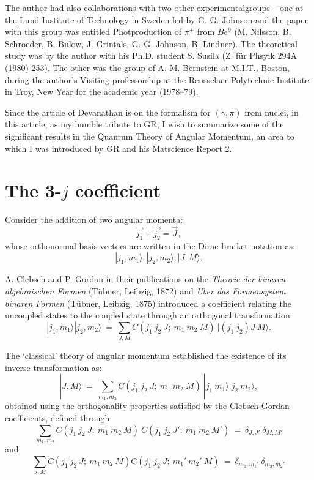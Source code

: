 The author had also collaborations with two other experimental\break groups -- one at the Lund Institute of Technology in Sweden led by G. G. Johnson and the paper with this group was  entitled Photproduction of $\pi^+$ from $Be^9$ (M. Nilsson, B. Schroeder, B. Bulow, J. Grintals, G. G. Johnson, B. Lindner). The theoretical study was by the author with his Ph.D. student S. Susila (Z. für Phsyik 294A (1980) 253). The other was the group of A. M. Bernstein at M.I.T., Boston, during the author's Visiting professorship at the Rensselaer Polytechnic Institute in Troy, New Year for the academic year (1978--79).

Since the article of Devanathan is on the formalism for $(\gamma,\pi)$ from nuclei, in this article, as my humble tribute to GR, I wish to summarize some of the significant results in the Quantum Theory of Angular Momentum, an area to which I was introduced by GR and his Matscience Report 2.

\section*{The 3-$j$ coefficient}

Consider the addition of two angular momenta:
\makeatletter
{}
\makeatother
\begin{equation}
\vec{j_1} + \vec{j_2} = \vec{J}, \label{chap7-eq1} 
\end{equation}
whose orthonormal basis vectors are written in the Dirac bra-ket notation as:
\begin{equation} 
|j_1,m_1\rangle , |j_2,m_2\rangle, |J,M\rangle. \label{chap7-eq2}
\end{equation}

A. Clebsch and P. Gordan in their publications on the \textit{Theorie der binaren algebraischen Formen} (Tübner, Leibzig, 1872) and \textit{Uber das Formensystem binaren Formen} (Tübner, Leibzig, 1875) introduced a coefficient relating the uncoupled states to the coupled state through an orthogonal transformation:
\begin{equation}
|j_1,m_1\rangle|j_2,m_2\rangle\ =\ \sum_{J,M} C(j_1\ j_2\ J;\ m_1\ m_2\ M)\ |(j_1\ j_2)J\ M\rangle. \label{chap7-eq3}
\end{equation}

The `classical' theory of angular momentum established the existence of its inverse transformation as:
\begin{equation}
|J,M\rangle\ =\ \sum_{m_1,m_2} C(j_1\ j_2\ J;\ m_1\ m_2\ M)\ |j_1\ m_1\rangle |j_2\  m_2\rangle, \label{chap7-eq4}
\end{equation}
obtained using the orthogonality properties satisfied by the Clebsch-Gordan coefficients, defined through:
\begin{equation}
\sum_{m_1,m_2} C(j_1\ j_2\ J;\ m_1\ m_2\ M)\ C(j_1\ j_2\ J';\ m_1\ m_2\ M')\ =\ \delta_{J,J'}\ \delta_{M,M'} \label{chap7-eq5}
\end{equation}
and
\begin{equation}
\sum_{J,M} C(j_1\ j_2\ J;\ m_1\ m_2\ M)C(j_1\ j_2\ J;\ m_1'\ m_2'\ M)\ =\ \delta_{m_1,m_1'} \ \delta_{m_2,m_2'} \label{chap7-eq6}
\end{equation}


